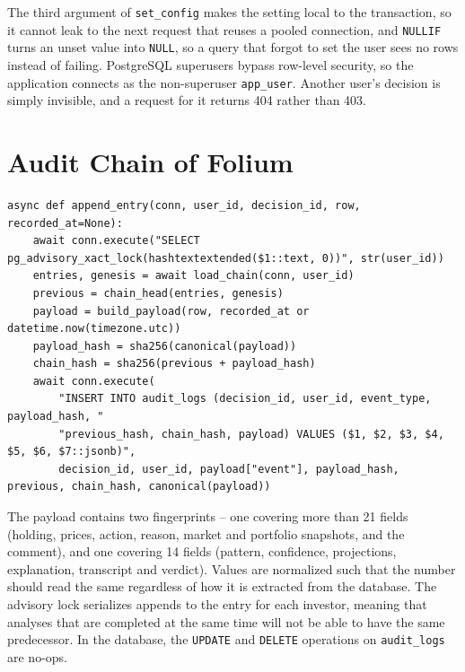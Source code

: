 The third argument of \texttt{set\_config} makes the setting local to the transaction, so it cannot leak to the next request that reuses a pooled connection, and \texttt{NULLIF} turns an unset value into \texttt{NULL}, so a query that forgot to set the user sees no rows instead of failing. PostgreSQL superusers bypass row-level security, so the application connects as the non-superuser \texttt{app\_user}. Another user's decision is simply invisible, and a request for it returns 404 rather than 403.

\section{Audit Chain of Folium}
\begin{lstlisting}[caption={Appending an audit entry under a per-investor lock (\texttt{backend/core/audit.py})}, label=lst:audit]
async def append_entry(conn, user_id, decision_id, row, recorded_at=None):
    await conn.execute("SELECT pg_advisory_xact_lock(hashtextextended($1::text, 0))", str(user_id))
    entries, genesis = await load_chain(conn, user_id)
    previous = chain_head(entries, genesis)
    payload = build_payload(row, recorded_at or datetime.now(timezone.utc))
    payload_hash = sha256(canonical(payload))
    chain_hash = sha256(previous + payload_hash)
    await conn.execute(
        "INSERT INTO audit_logs (decision_id, user_id, event_type, payload_hash, "
        "previous_hash, chain_hash, payload) VALUES ($1, $2, $3, $4, $5, $6, $7::jsonb)",
        decision_id, user_id, payload["event"], payload_hash, previous, chain_hash, canonical(payload))
\end{lstlisting}

The payload contains two fingerprints – one covering more than 21 fields (holding, prices, action, reason, market and portfolio snapshots, and the comment), and one covering 14 fields (pattern, confidence, projections, explanation, transcript and verdict).
Values are normalized such that the number should read the same regardless of how it is extracted from the database. The advisory lock serializes appends to the entry for each investor, meaning that analyses that are completed at the same time will not be able to have the same predecessor. In the database, the \texttt{UPDATE} and \texttt{DELETE} operations on \texttt{audit\_logs} are no-ops.

